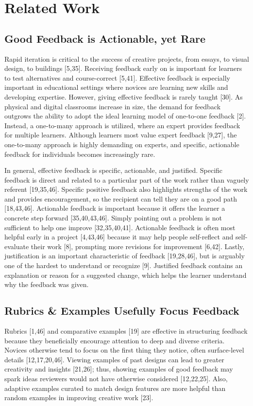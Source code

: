 \section{Related Work}
\subsection{Good Feedback is Actionable, yet Rare}
Rapid iteration is critical to the success of creative projects, from essays, to visual design, to buildings [5,35]. Receiving feedback early on is important for learners to test alternatives and course-correct [5,41]. Effective feedback is especially important in educational settings where novices are learning new skills and developing expertise. However, giving effective feedback is rarely taught [30]. As physical and digital classrooms increase in size, the demand for feedback outgrows the ability to adopt the ideal learning model of one-to-one feedback [2]. Instead, a one-to-many approach is utilized, where an expert provides feedback for multiple learners. Although learners most value expert feedback [9,27], the one-to-many approach is highly demanding on experts, and specific, actionable feedback for individuals becomes increasingly rare. 

In general, effective feedback is specific, actionable, and justified. Specific feedback is direct and related to a particular part of the work rather than vaguely referent [19,35,46]. Specific positive feedback also highlights strengths of the work and provides encouragement, so the recipient can tell they are on a good path [18,43,46]. Actionable feedback is important because it offers the learner a concrete step forward [35,40,43,46]. Simply pointing out a problem is not sufficient to help one improve [32,35,40,41]. Actionable feedback is often most helpful early in a project [4,43,46] because it may help people self-reflect and self-evaluate their work [8], prompting more revisions for improvement [6,42]. Lastly, justification is an important characteristic of feedback [19,28,46], but is arguably one of the hardest to understand or recognize [9]. Justified feedback contains an explanation or reason for a suggested change, which helps the learner understand why the feedback was given.

\subsection{Rubrics \& Examples Usefully Focus Feedback}
Rubrics [1,46] and comparative examples [19] are effective in structuring feedback because they beneficially encourage attention to deep and diverse criteria. Novices otherwise tend to focus on the first thing they notice, often surface-level details [12,17,20,46]. Viewing examples of past designs can lead to greater creativity and insights [21,26]; thus, showing examples of good feedback may spark ideas reviewers would not have otherwise considered [12,22,25]. Also, adaptive examples curated to match design features are more helpful than random examples in improving creative work [23]. 

